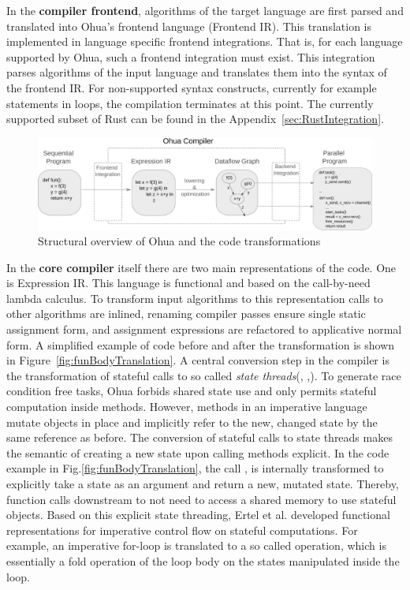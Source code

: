 In the \textbf{compiler frontend}, algorithms of the target language are first parsed and translated into Ohua's frontend language (Frontend IR). This translation is implemented in language specific frontend integrations. That is, for each language supported by Ohua, such a frontend integration must exist. This integration parses algorithms of the input language and translates them into the syntax of the frontend IR. For non-supported syntax constructs, currently for example  statements in loops, the compilation terminates at this point. The currently supported subset of Rust can be found in the Appendix~\ref{sec:RustIntegration}.

\begin{figure}[H]
    \centering
    \includegraphics[scale= 0.36]{figures/ohua_fine_with_channels.png}
    \caption{Structural overview of Ohua and the code transformations}
    \label{fig:ohua_fine}
\end{figure}

In the \textbf{core compiler} itself there are two main representations of the code. One is Expression IR. This language is functional and based on the call-by-need lambda calculus. To transform input algorithms to this representation 
calls to other algorithms are inlined, renaming compiler passes ensure single static assignment form, and assignment expressions are refactored to applicative normal form. A simplified example of code before and after the transformation is shown in Figure~\ref{fig:funBodyTranslation}. A central conversion step in the compiler is the transformation of stateful calls to so called \emph{state threads}(\cite{wadler1992essence}, \cite{launchbury1994lazy},\cite{ertel2019stclang}). To generate race condition free tasks, Ohua forbids shared state use and only permits stateful computation inside methods. However, methods in an imperative language mutate objects in place and implicitly refer to the new, changed state by the same reference as before. The conversion of stateful calls to state threads makes the semantic of creating a new state upon calling methods explicit. In the code example in Fig.\ref{fig:funBodyTranslation}, the call , is internally transformed to explicitly take a state as an argument and return a new, mutated state. Thereby, function calls downstream to not need to access a shared memory to use stateful objects. Based on this explicit state threading, Ertel et al. \cite{ertel2019stclang, ertel2018supporting} developed functional representations for imperative control flow on stateful computations. For example, an imperative for-loop is translated to a so called  operation, which is essentially a fold operation of the loop body on the states manipulated inside the loop. \\

